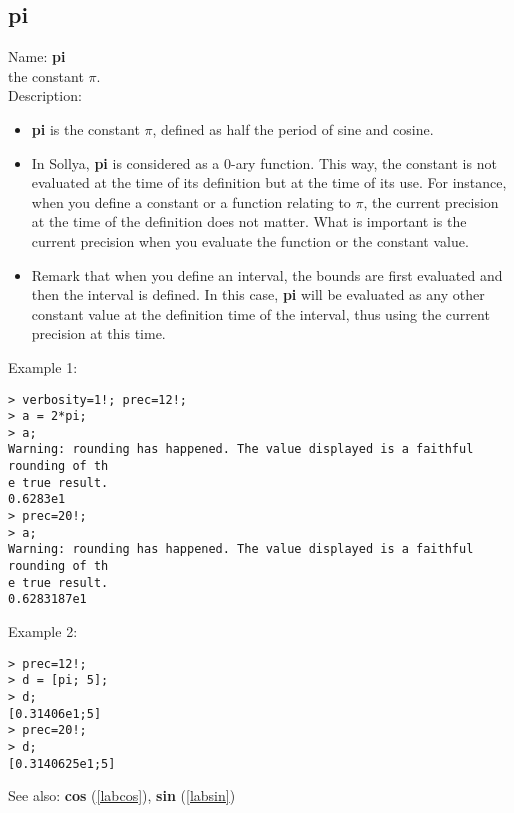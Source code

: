 \subsection{pi}
\label{labpi}
\noindent Name: \textbf{pi}\\
the constant $\pi$.\\

\noindent Description: \begin{itemize}

\item \textbf{pi} is the constant $\pi$, defined as half the period of sine and cosine.

\item In Sollya, \textbf{pi} is considered as a 0-ary function. This way, the constant 
   is not evaluated at the time of its definition but at the time of its use. For 
   instance, when you define a constant or a function relating to $\pi$, the current
   precision at the time of the definition does not matter. What is important is 
   the current precision when you evaluate the function or the constant value.

\item Remark that when you define an interval, the bounds are first evaluated and 
   then the interval is defined. In this case, \textbf{pi} will be evaluated as any 
   other constant value at the definition time of the interval, thus using the 
   current precision at this time.
\end{itemize}
\noindent Example 1: 
\begin{center}\begin{minipage}{15cm}\begin{Verbatim}[frame=single]
> verbosity=1!; prec=12!;
> a = 2*pi;
> a;
Warning: rounding has happened. The value displayed is a faithful rounding of th
e true result.
0.6283e1
> prec=20!;
> a;
Warning: rounding has happened. The value displayed is a faithful rounding of th
e true result.
0.6283187e1
\end{Verbatim}
\end{minipage}\end{center}
\noindent Example 2: 
\begin{center}\begin{minipage}{15cm}\begin{Verbatim}[frame=single]
> prec=12!;
> d = [pi; 5];
> d;
[0.31406e1;5]
> prec=20!;
> d;
[0.3140625e1;5]
\end{Verbatim}
\end{minipage}\end{center}
See also: \textbf{cos} (\ref{labcos}), \textbf{sin} (\ref{labsin})
